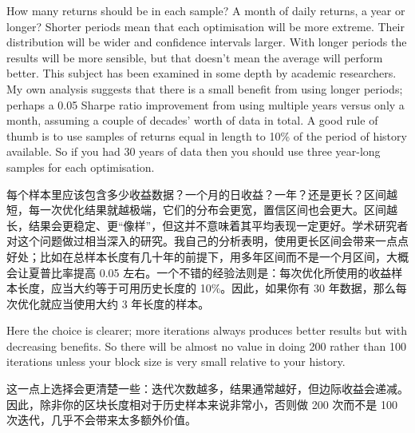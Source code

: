\begin{englishblock} How many returns should be in each sample? A month of daily returns, a year or longer? Shorter periods mean that each optimisation will be more extreme. Their distribution will be wider and confidence intervals larger. With longer periods the results will be more sensible, but that doesn't mean the average will perform better. This subject has been examined in some depth by academic researchers. My own analysis suggests that there is a small benefit from using longer periods; perhaps a 0.05 Sharpe ratio improvement from using multiple years versus only a month, assuming a couple of decades' worth of data in total. A good rule of thumb is to use samples of returns equal in length to 10\% of the period of history available. So if you had 30 years of data then you should use three year-long samples for each optimisation. \end{englishblock}

\begin{chineseblock}每个样本里应该包含多少收益数据？一个月的日收益？一年？还是更长？区间越短，每一次优化结果就越极端，它们的分布会更宽，置信区间也会更大。区间越长，结果会更稳定、更“像样”，但这并不意味着其平均表现一定更好。学术研究者对这个问题做过相当深入的研究。我自己的分析表明，使用更长区间会带来一点点好处；比如在总样本长度有几十年的前提下，用多年区间而不是一个月区间，大概会让夏普比率提高 0.05 左右。一个不错的经验法则是：每次优化所使用的收益样本长度，应当大约等于可用历史长度的 10\%。因此，如果你有 30 年数据，那么每次优化就应当使用大约 3 年长度的样本。\end{chineseblock}


\begin{englishblock} Here the choice is clearer; more iterations always produces better results but with decreasing benefits. So there will be almost no value in doing 200 rather than 100 iterations unless your block size is very small relative to your history. \end{englishblock}

\begin{chineseblock}这一点上选择会更清楚一些：迭代次数越多，结果通常越好，但边际收益会递减。因此，除非你的区块长度相对于历史样本来说非常小，否则做 200 次而不是 100 次迭代，几乎不会带来太多额外价值。\end{chineseblock}



